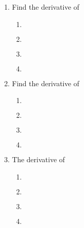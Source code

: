 \begin{multicols}{2}
\begin{enumerate}[label={\arabic*.}]
\item Find the derivative of 
\begin{enumerate}[label={\Alph*.}]
\item \(\)
\item \(\)
\item \(\)
\item \(\)
\end{enumerate}
\item Find the derivative of 
\begin{enumerate}[label={\Alph*.}]
\item \(\)
\item \(\)
\item \(\)
\item \(\)
\end{enumerate}
\item The derivative of 
\begin{enumerate}[label={\Alph*.}]
\item \(\)
\item \(\)
\item \(\)
\item \(\)
\end{enumerate}
\end{enumerate}
\end{multicols}
